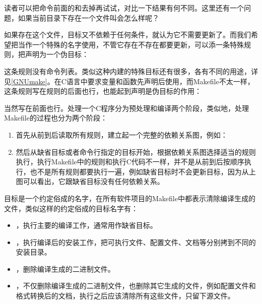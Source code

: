 

读者可以把命令前面的和\BookCode{-\BookSplit{}}去掉再试试，对比一下结果有何不同。这里还有一个问题，如果当前目录下存在一个文件叫会怎么样呢？




如果存在这个文件，目标又不依赖于任何条件，就认为它不需要更新了。而我们希望把当作一个特殊的名字使用，不管它存在不存在都要更新，可以添一条特殊规则，把声明为一个伪目标：




这条规则没有命令列表。类似这种内建的特殊目标还有很多，各有不同的用途，详见\hyperlink{db.bi01.bibli.make}{[GNUmake]}。在C语言中要求变量和函数先声明后使用，而Makefile不太一样，这条规则写在规则的后面也行，也能起到声明是伪目标的作用：




当然写在前面也行。处理一个C程序分为预处理和编译两个阶段，类似地，处理Makefile的过程也分为两个阶段：


\begin{enumerate}

\item 首先从前到后读取所有规则，建立起一个完整的依赖关系图，例如：



\item 然后从缺省目标或者命令行指定的目标开始，根据依赖关系图选择适当的规则执行，执行Makefile中的规则和执行C代码不一样，并不是从前到后按顺序执行，也不是所有规则都要执行一遍，例如缺省目标时不会更新目标，因为从上图可以看出，它跟缺省目标没有任何依赖关系。
\end{enumerate}


目标是一个约定俗成的名字，在所有软件项目的Makefile中都表示清除编译生成的文件，类似这样的约定俗成的目标名字有：


\begin{itemize}

\item {}，执行主要的编译工作，通常用作缺省目标。

\item {}，执行编译后的安装工作，把可执行文件、配置文件、文档等分别拷到不同的安装目录。

\item {}，删除编译生成的二进制文件。

\item {}，不仅删除编译生成的二进制文件，也删除其它生成的文件，例如配置文件和格式转换后的文档，执行之后应该清除所有这些文件，只留下源文件。
\end{itemize}

